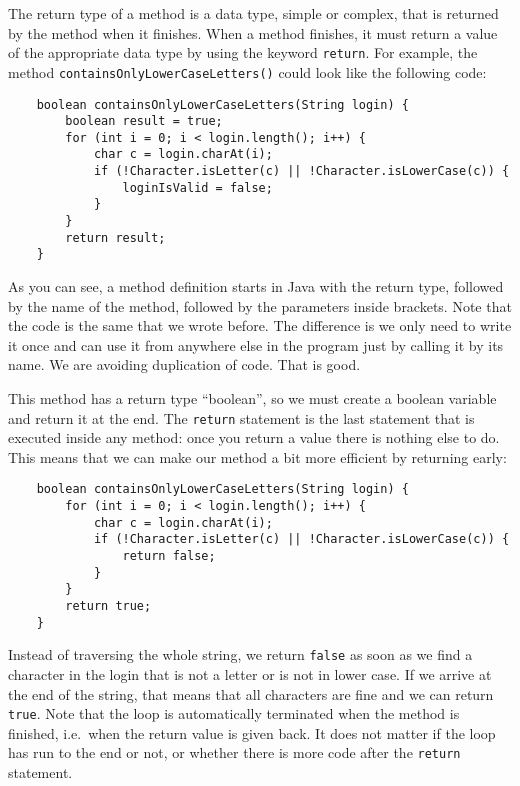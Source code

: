 The return type of a method is a data type, simple or complex, that is
returned by the method when it finishes. When a method finishes, it
must return a value of the appropriate data type by using the keyword
\verb+return+. For example, the method
\verb+containsOnlyLowerCaseLetters()+ could look 
like the following code:

\begin{verbatim}
    boolean containsOnlyLowerCaseLetters(String login) {
        boolean result = true;
        for (int i = 0; i < login.length(); i++) {
            char c = login.charAt(i);
            if (!Character.isLetter(c) || !Character.isLowerCase(c)) {
                loginIsValid = false;
            }
        }
        return result;
    }
\end{verbatim}

As you can see, a method definition starts in Java with the return
type, followed by the name of the method, followed by the parameters
inside brackets. 
Note that the code is the same that we wrote before. The difference is
we only need to write it once and can use it from anywhere else in the
program just by calling it by its name. 
We are avoiding duplication of code. That is good. 

This method has a return type ``boolean'', so we
must create a boolean variable and return it at the end. The \verb+return+
statement is the last statement that is executed inside any method:
once you return a value there is nothing else to do. This means
that we can make our method a bit more efficient by returning early: 

\begin{verbatim}
    boolean containsOnlyLowerCaseLetters(String login) {
        for (int i = 0; i < login.length(); i++) {
            char c = login.charAt(i);
            if (!Character.isLetter(c) || !Character.isLowerCase(c)) {
                return false;
            }
        }
        return true;
    }
\end{verbatim}

Instead of traversing the whole string, we return \verb+false+ as soon
as we find a character in the login that is not a letter or is not
in lower case. If we arrive at the end of the string, that means that
all characters are fine and we can return \verb+true+. Note that the
loop is automatically terminated when the method is finished,
i.e.~when the return value is given back. It does not matter if the
loop has run to the end or not, or whether there is more code after
the \verb+return+ statement. 

